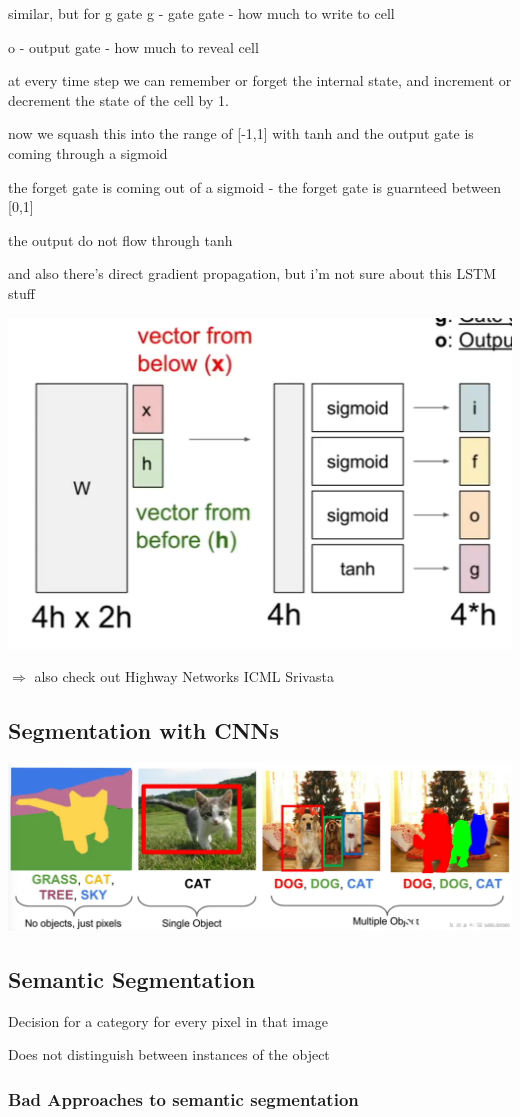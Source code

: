 similar, but for g gate
g - gate gate - how much to write to cell

o - output gate - how much to reveal cell

at every time step we can remember or forget the internal state, and increment or decrement the state of the cell by 1.

now we squash this into the range of [-1,1] with tanh and the output gate is coming through a sigmoid

the forget gate is coming out of a sigmoid - the forget gate is guarnteed between [0,1]

the output do not flow through tanh

and also there's direct gradient propagation, but i'm not sure about this LSTM stuff

\includegraphics[width=0.5\columnwidth]{fei_fei_li/lecture_10/lstm_arch.png}

$\Rightarrow$ also check out Highway Networks ICML Srivasta

\subsection{Segmentation with CNNs}

\includegraphics[width=0.5\columnwidth]{fei_fei_li/lecture_11/semantic_segmentation.png}

\subsection{Semantic Segmentation}

Decision for a category for every pixel in that image

Does not distinguish between instances of the object

\subsubsection{Bad Approaches to semantic segmentation}

